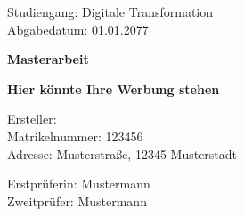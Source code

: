 \thispagestyle{empty}
\begin{flushleft}
    Studiengang: Digitale Transformation\\
    \vspace{0,5cm}
    Abgabedatum: 01.01.2077
\end{flushleft}

\vspace{3\baselineskip}%
\begin{center}
\begin{large}
    \textbf{Masterarbeit\\}
\end{large}
\begin{Large}
\begin{singlespace}
    \textbf{Hier könnte Ihre Werbung stehen}
\end{singlespace}
\end{Large}
\end{center}
\vfill
\begin{flushleft}
    Ersteller: \theauthor\\
    Matrikelnummer: 123456\\

    Adresse: Musterstraße, 12345 Musterstadt

\vspace{1cm}
Erstprüferin: Mustermann\\
\vspace{0,25cm}
Zweitprüfer: Mustermann
\end{flushleft}
\newpage